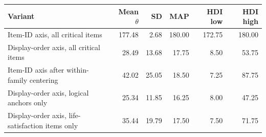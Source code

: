 \begin{tabular}{@{}lrrrrr@{}}
\toprule
Variant & Mean $\theta$ & SD & MAP & HDI low & HDI high \\
\midrule
Item-ID axis, all critical items & 177.48 & 2.68 & 180.00 & 172.75 & 180.00 \\
Display-order axis, all critical items & 28.49 & 13.68 & 17.75 & 8.50 & 53.75 \\
Item-ID axis after within-family centering & 42.02 & 25.05 & 18.50 & 7.25 & 87.75 \\
Display-order axis, logical anchors only & 25.34 & 11.85 & 16.25 & 8.00 & 47.25 \\
Display-order axis, life-satisfaction items only & 35.44 & 19.79 & 17.50 & 7.50 & 71.75 \\
\bottomrule
\end{tabular}